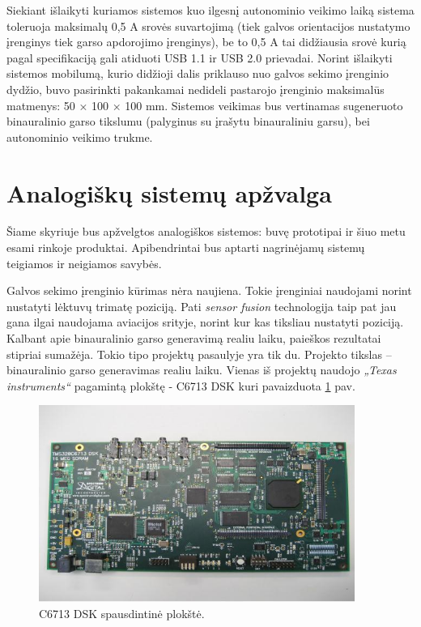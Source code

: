 \documentclass[]{vgtuef}
\begin{document}
Siekiant išlaikyti kuriamos sistemos kuo ilgesnį autonominio veikimo laiką sistema toleruoja maksimalų 0,5 A srovės suvartojimą (tiek galvos orientacijos nustatymo įrenginys tiek garso apdorojimo įrenginys), be to 0,5 A tai didžiausia srovė kurią pagal specifikaciją gali atiduoti USB 1.1 ir USB 2.0 prievadai.
Norint išlaikyti sistemos mobilumą, kurio didžioji dalis priklauso nuo galvos sekimo įrenginio dydžio, buvo pasirinkti pakankamai nedideli pastarojo įrenginio maksimalūs matmenys: 50 × 100 × 100 mm.  
Sistemos veikimas bus vertinamas sugeneruoto binauralinio garso tikslumu (palyginus su įrašytu binauraliniu garsu), bei autonominio veikimo trukme.


\section{Analogiškų sistemų apžvalga}

Šiame skyriuje bus apžvelgtos analogiškos sistemos: buvę prototipai ir šiuo metu esami rinkoje produktai. Apibendrintai bus aptarti nagrinėjamų sistemų teigiamos ir neigiamos savybės. 


Galvos sekimo įrenginio kūrimas nėra naujiena. Tokie įrenginiai naudojami norint nustatyti lėktuvų  trimatę poziciją. Pati \textit{sensor fusion} technologija taip pat jau gana ilgai naudojama aviacijos srityje, norint kur kas tiksliau nustatyti poziciją.
Kalbant apie binauralinio garso generavimą realiu laiku, paieškos rezultatai stipriai sumažėja. Tokio tipo projektų pasaulyje yra tik du. Projekto tikslas – binauralinio garso generavimas realiu laiku. Vienas iš projektų naudojo \textit{„Texas instruments“} pagamintą plokštę - C6713 DSK kuri pavaizduota \ref{fig:C6713_dsk_board} pav.

\begin{figure}[!ht]
  \centering
  \includegraphics[width=390px]{img/c6713.jpg}
  \caption{C6713 DSK spausdintinė plokštė.}
  \label{fig:C6713_dsk_board}
\end{figure}
\end{document}
